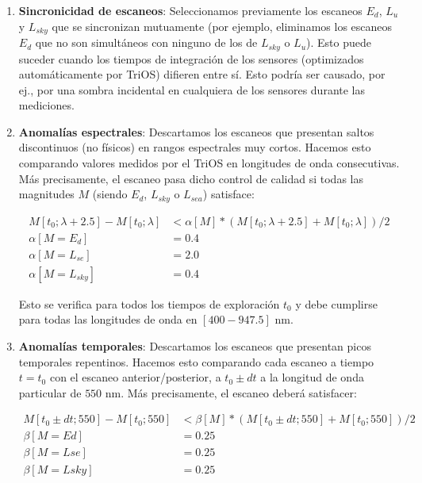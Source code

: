             \begin{enumerate}
                \item \textbf{Sincronicidad de escaneos}: Seleccionamos previamente los escaneos $E_{d}$, $L_{u}$ y $L_{sky}$ que se sincronizan mutuamente (por ejemplo, eliminamos los escaneos $E_{d}$ que no son simultáneos con ninguno de los de $L_{sky}$ o $L_{u}$). Esto puede suceder cuando los tiempos de integración de los sensores (optimizados automáticamente por TriOS) difieren entre sí. Esto podría ser causado, por ej., por una sombra incidental en cualquiera de los sensores durante las mediciones.

                \item \textbf{Anomalías espectrales}: Descartamos los escaneos que presentan saltos discontinuos (no físicos) en rangos espectrales muy cortos. Hacemos esto comparando valores medidos por el TriOS en longitudes de onda consecutivas. Más precisamente, el escaneo pasa dicho control de calidad si todas las magnitudes $M$ (siendo $E_{d}$, $L_{sky}$ o $L_{sea}$) satisface:
            
                \begin{equation}
                \begin{aligned}
                    M[t_{0}; \lambda + 2.5] - M[t_{0}; \lambda] & <  \alpha[M]*(M[t_{0}; \lambda + 2.5] + M[t_{0}; \lambda])/2\\
                    \alpha[M = E_{d}  ] & = 0.4\\
                    \alpha[M = L_{se} ] & = 2.0\\
                    \alpha[M = L_{sky}] & = 0.4                      
                \end{aligned}
                \end{equation}
                
                Esto se verifica para todos los tiempos de exploración $t_{0}$ y debe cumplirse para todas las longitudes de onda en $[400-947.5]$ nm.

                \item \textbf{Anomalías temporales}: Descartamos los escaneos que presentan picos temporales repentinos. Hacemos esto comparando cada escaneo a tiempo $t=t_{0}$ con el escaneo anterior/posterior, a $t_{0}\pm dt$ a la longitud de onda particular de $550$ nm. Más precisamente, el escaneo deberá satisfacer:

                \begin{equation}
                \begin{aligned}
                    M[t_{0} \pm dt; 550] - M[t_{0}; 550] & <  \beta[M]*(M[t_{0} \pm dt; 550] + M[t_{0}; 550])/2\\
                    \beta[M = Ed  ] & = 0.25\\
                    \beta[M = Lse ] & = 0.25\\
                    \beta[M = Lsky] & = 0.25\\
                \end{aligned}
                \end{equation}
            

\end{enumerate}
